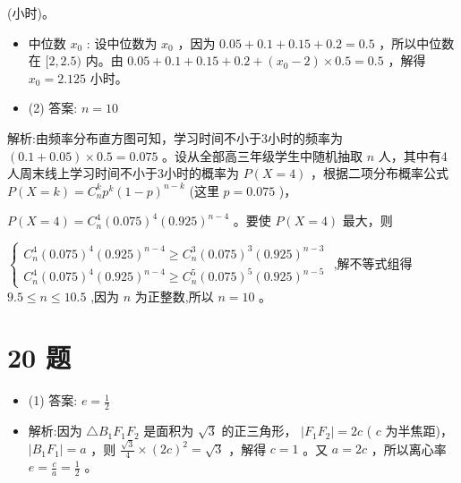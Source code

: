 \documentclass[10pt]{article}
\begin{document}
(小时)。

\begin{itemize}\relax
\item\relax 中位数 \({x}_{0}\) : 设中位数为 \({x}_{0}\) ，因为 \({0.05} + {0.1} + {0.15} + {0.2} = {0.5}\) ，所以中位数在 \(\lbrack 2,{2.5})\) 内。由 \({0.05} + {0.1} + {0.15} + {0.2} + \left( {{x}_{0} - 2}\right)  \times  {0.5} = {0.5}\) ，解得 \({x}_{0} = {2.125}\) 小时。
\end{itemize}

\begin{itemize}\relax
\item\relax (2) 答案: \(n = {10}\)
\end{itemize}

解析:由频率分布直方图可知，学习时间不小于3小时的频率为 \(\left( {{0.1} + {0.05}}\right)  \times  {0.5} = {0.075}\) 。设从全部高三年级学生中随机抽取 \(n\) 人，其中有4人周末线上学习时间不小于3小时的概率为 \(P\left( {X = 4}\right)\) ，根据二项分布概率公式 \(P\left( {X = k}\right)  = {C}_{n}^{k}{p}^{k}{\left( 1 - p\right) }^{n - k}\) (这里 \(p = {0.075}\) )，

\(P\left( {X = 4}\right)  = {C}_{n}^{4}{\left( {0.075}\right) }^{4}{\left( {0.925}\right) }^{n - 4}\) 。要使 \(P\left( {X = 4}\right)\) 最大，则

\(\left\{  \begin{array}{l} {C}_{n}^{4}{\left( {0.075}\right) }^{4}{\left( {0.925}\right) }^{n - 4} \geq  {C}_{n}^{3}{\left( {0.075}\right) }^{3}{\left( {0.925}\right) }^{n - 3} \\  {C}_{n}^{4}{\left( {0.075}\right) }^{4}{\left( {0.925}\right) }^{n - 4} \geq  {C}_{n}^{5}{\left( {0.075}\right) }^{5}{\left( {0.925}\right) }^{n - 5} \end{array}\right.\) ,解不等式组得 \({9.5} \leq  n \leq  {10.5}\) ,因为 \(n\) 为正整数,所以 \(n = {10}\) 。

\section*{20 题}

\begin{itemize}\relax
\item\relax (1) 答案: \(e = \frac{1}{2}\)
\end{itemize}

\begin{itemize}\relax
\item\relax 解析:因为 \(\bigtriangleup {B}_{1}{F}_{1}{F}_{2}\) 是面积为 \(\sqrt{3}\) 的正三角形， \(\left| {{F}_{1}{F}_{2}}\right|  = {2c}\) ( \(c\) 为半焦距)， \(\left| {{B}_{1}{F}_{1}}\right|  = a\) ，则 \(\frac{\sqrt{3}}{4} \times  {\left( 2c\right) }^{2} = \sqrt{3}\) ，解得 \(c = 1\) 。又 \(a = {2c}\) ，所以离心率 \(e = \frac{c}{a} = \frac{1}{2}\) 。
\end{itemize}
\end{document}
